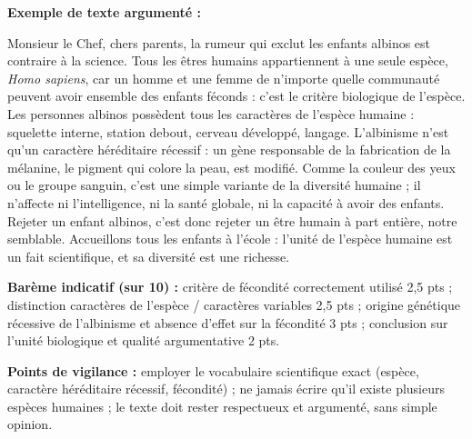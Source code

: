 \documentclass[11pt]{article}
\begin{document}
\begin{corrige}
\textbf{Exemple de texte argumenté :}

\og Monsieur le Chef, chers parents, la rumeur qui exclut les enfants albinos est contraire à la science. Tous les êtres humains appartiennent à une seule espèce, \emph{Homo sapiens}, car un homme et une femme de n'importe quelle communauté peuvent avoir ensemble des enfants féconds : c'est le critère biologique de l'espèce. Les personnes albinos possèdent tous les caractères de l'espèce humaine : squelette interne, station debout, cerveau développé, langage. L'albinisme n'est qu'un caractère héréditaire récessif : un gène responsable de la fabrication de la mélanine, le pigment qui colore la peau, est modifié. Comme la couleur des yeux ou le groupe sanguin, c'est une simple variante de la diversité humaine ; il n'affecte ni l'intelligence, ni la santé globale, ni la capacité à avoir des enfants. Rejeter un enfant albinos, c'est donc rejeter un être humain à part entière, notre semblable. Accueillons tous les enfants à l'école : l'unité de l'espèce humaine est un fait scientifique, et sa diversité est une richesse. \fg

\textbf{Barème indicatif (sur 10) :} critère de fécondité correctement utilisé 2,5 pts ; distinction caractères de l'espèce / caractères variables 2,5 pts ; origine génétique récessive de l'albinisme et absence d'effet sur la fécondité 3 pts ; conclusion sur l'unité biologique et qualité argumentative 2 pts.

\textbf{Points de vigilance :} employer le vocabulaire scientifique exact (espèce, caractère héréditaire récessif, fécondité) ; ne jamais écrire qu'il existe plusieurs espèces humaines ; le texte doit rester respectueux et argumenté, sans simple opinion.
\end{corrige}
\end{document}
